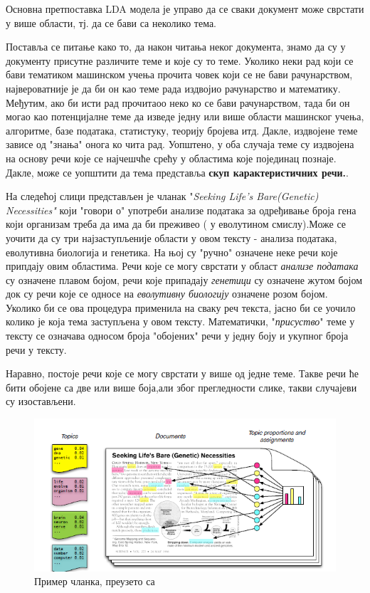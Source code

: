 Основна претпоставка  LDA модела је управо да се сваки документ може сврстати у више области, тј. да се бави са неколико тема. 

Поставља се питање како то, да након читања неког документа, знамо да су у документу присутне различите теме и које су то теме. Уколико неки рад који се бави тематиком машинском учења прочита човек који се не бави рачунарством, највероватније је да би он као теме рада издвојио рачунарство и математику. Међутим, ако би исти рад прочитаоо неко ко се бави рачунарством, тада би он могао као потенцијалне теме да изведе једну или више области машинског учења, алгоритме, базе података, статистуку, теорију бројева итд. 
Дакле, издвојене теме зависе од "знања" онога ко чита рад. Уопштено, у оба случаја теме су издвојена на основу речи које се најчешчће срећу у областима које појединац познаје. Дакле, може се уопштити да тема представља \textbf{скуп карактеристичних речи.}. 

На следећој слици представљен је чланак "\textit{Seeking Life's Bare(Genetic) Necessities"} који "говори о" употреби анализе података за одређивање броја гена који организам треба да има да би преживео ( у еволутином смислу).Може се уочити да су три најзаступљеније области у овом тексту - анализа података, еволутивна биологија  и генетика. На њој су "ручно" означене неке речи које припдају овим областима. Речи које се могу сврстати у област \textit{анализе података} су означене плавом бојом, речи које припадају \textit{генетици} су означене жутом бојом док су речи које се односе на \textit{еволутивну биологију} означене розом бојом.
Уколико би се ова процедура применила на сваку реч текста, јасно би се уочило колико је која тема  заступљена у овом тексту. Математички, "\textit{присуство}" теме у тексту се означава односом  броја "обојених" речи у једну боју и укупног броја речи у тексту.

Наравно, постоје речи које се могу сврстати у више од једне теме. Такве речи ће бити обојене са две или више боја,али због прегледности слике, такви случајеви су изостављени.

\begin{figure}
    \centering
   \includegraphics[scale=0.9]{./Slike/slika1.png} 
	\caption{Пример чланка, преузето са \cite{blei1}}
	\label{fig:slika1}
\end{figure}

